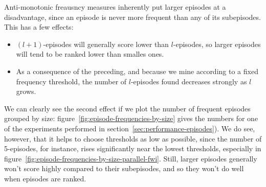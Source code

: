 Anti-monotonic freausncy measures inherently put larger episodes at a disadvantage, since an episode is never more frequent than any of its subepisodes. This has a few effects:
\begin{itemize}
\item $ (l + 1) $-episodes will generally score lower than $ l $-episodes, so larger episodes will tend to be ranked lower than smalles ones.
\item As a consequence of the preceding, and because we mine according to a fixed frequency threshold, the number of $ l $-episodes found decreases strongly as $ l $ grows.
\end{itemize}
We can clearly see the second effect if we plot the number of frequent episodes grouped by size: figure~\ref{fig:episode-frequencies-by-size} gives the numbers for one of the experiments performed in section~\ref{sec:performance-episodes}). We do see, however, that it helps to choose thresholds as low as possible, since the number of 5-episodes, for instance, rises significantly near the lowest thresholds, especially in figure~\ref{fig:episode-frequencies-by-size-parallel-fwi}. Still, larger episodes generally won't score highly compared to their subepisodes, and so they won't do well when episodes are ranked.

